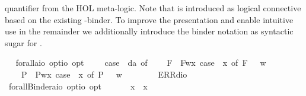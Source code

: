 \begin{isabellebody}
\begin{isamarkuptext}
  quantifier from the HOL meta-logic. Note that \isa{\isactrlbold {\isasymforall}} is introduced as logical connective
  based on the existing \isa{{\isasymlambda}}-binder. To improve the presentation and enable intuitive use 
  in the remainder we additionally
  introduce the binder notation  as syntactic sugar for .%
\end{isamarkuptext}\isamarkuptrue%
\ \isamarkupfalse%
\ forall{\isacharcolon}{\isacharcolon}{\isachardoublequoteopen}{\isacharparenleft}{\isacharprime}a{\isasymRightarrow}io\ opt{\isacharparenright}{\isasymRightarrow}io\ opt{\isachardoublequoteclose}\ {\isacharparenleft}{\isachardoublequoteopen}\isactrlbold {\isasymforall}{\isachardoublequoteclose}{\isacharparenright}\ \ {\isachardoublequoteopen}\isactrlbold {\isasymforall}{\isasymPhi}\ {\isasymequiv}\ case\ {\isacharparenleft}{\isasymPhi}\ da{\isacharparenright}\ of\isanewline
\ \ \ \ F{\isacharparenleft}{\isacharunderscore}{\isacharparenright}\ {\isasymRightarrow}\ F{\isacharparenleft}{\isasymlambda}w{\isachardot}{\isasymforall}x{\isachardot}\ case\ {\isacharparenleft}{\isasymPhi}\ x{\isacharparenright}\ of\ F{\isacharparenleft}{\isasympsi}{\isacharparenright}\ {\isasymRightarrow}\ {\isasympsi}\ w{\isacharparenright}\ {\isacharbar}\ \isanewline
\ \ \ \ P{\isacharparenleft}{\isacharunderscore}{\isacharparenright}\ {\isasymRightarrow}\ P{\isacharparenleft}{\isasymlambda}w{\isachardot}{\isasymforall}x{\isachardot}\ case\ {\isacharparenleft}{\isasymPhi}\ x{\isacharparenright}\ of\ P{\isacharparenleft}{\isasympsi}{\isacharparenright}\ {\isasymRightarrow}\ {\isasympsi}\ w{\isacharparenright}\ {\isacharbar}\ \isanewline
\ \ \ \ {\isacharunderscore}\ {\isasymRightarrow}\ ERR{\isacharparenleft}dio{\isacharparenright}{\isachardoublequoteclose}\isanewline
\ \isamarkupfalse%
\ forallBinder{\isacharcolon}{\isacharcolon}{\isachardoublequoteopen}{\isacharparenleft}{\isacharprime}a{\isasymRightarrow}io\ opt{\isacharparenright}{\isasymRightarrow}io\ opt{\isachardoublequoteclose}\ {\isacharparenleft}\ {\isachardoublequoteopen}\isactrlbold {\isasymforall}{\isachardoublequoteclose}\ {\isacharbrackleft}{}{\isacharbrackright}\ {}{\isacharparenright}\ \ \ {\isachardoublequoteopen}\isactrlbold {\isasymforall}x{\isachardot}\ {\isasymphi}\ x\ {\isasymequiv}\ \isactrlbold {\isasymforall}{\isasymphi}{\isachardoublequoteclose}%

\end{isabellebody}
